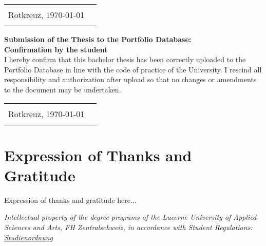 \begin{tabularx}{\textwidth}{@{}lX}
	&\\
	Rotkreuz, \today &  \\
	\cline{2-2}
	&\\[0.75cm]
\end{tabularx}

\textbf{Submission of the Thesis to the Portfolio Database:}\\[0.5cm]
\textbf{Confirmation by the student}\\[0.2cm]
I hereby confirm that this bachelor thesis has been correctly uploaded to the Portfolio Database in line with the code of practice of the University. I rescind all responsibility and authorization after upload so that no changes or amendments to the document may be undertaken.\\[0.8cm]

\begin{tabularx}{\textwidth}{@{}lX}
	&\\
	Rotkreuz, \today &  \\
	\cline{2-2}
	&\\[0.75cm]
\end{tabularx}

\newpage


\chapter*{Expression of Thanks and Gratitude}

Expression of thanks and gratitude here...

\vfill

\emph{Intellectual property of the degree programs of the Lucerne
University of Applied Sciences and Arts, FH Zentralschweiz, in
accordance with Student Regulations:
\href{https://srl.lu.ch/app/de/texts_of_law/521/versions/4065}{Studienordnung}}


